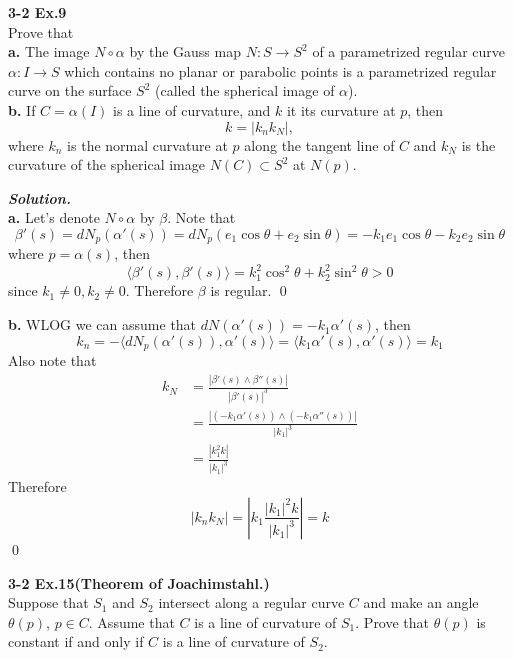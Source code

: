 \documentclass{article}
\begin{document}
\par
\textbf{3-2 Ex.9}\\
Prove that\\
\textbf{a. }The image $N \circ \alpha$ by the Gauss map
$N: S \to S^2$ of a parametrized regular curve $\alpha: I \to S$
which contains no planar or parabolic points is a parametrized
regular curve on the surface $S^2$ (called the spherical image
of $\alpha$).\\
\textbf{b. }If $C = \alpha(I)$ is a line of curvature, and $k$
it its curvature at $p$, then
$$
    k = \vert k_nk_N \vert,
$$
where $k_n$ is the normal curvature at $p$ along the tangent
line of $C$ and $k_N$ is the curvature of the spherical image
$N(C) \subset S^2$ at $N(p)$.

\par
\textbf{\textit{Solution.}}\\
\textbf{a. }Let's denote $N \circ \alpha$ by $\beta$.
Note that
$$
    \beta'(s) = dN_p(\alpha'(s)) = dN_p(e_1 \cos \theta + e_2 \sin \theta)
    = -k_1e_1 \cos \theta - k_2e_2 \sin \theta
$$
where $p = \alpha(s)$, then
$$
    \langle \beta'(s), \beta'(s) \rangle = k_1^2 \cos^2 \theta + k_2^2 \sin^2 \theta > 0
$$
since $k_1 \neq 0, k_2 \neq 0$. Therefore $\beta$ is regular. \qed

\par
\textbf{b. }WLOG we can assume that $dN(\alpha'(s)) = -k_1\alpha'(s)$, then
$$
    k_n = -\langle dN_p(\alpha'(s)), \alpha'(s) \rangle = \langle k_1\alpha'(s), \alpha'(s) \rangle = k_1
$$
Also note that 
$$
\begin{aligned}
    k_N &= \frac{|\beta'(s) \wedge \beta''(s)|}{|\beta'(s)|^3}\\
    &= \frac{|(-k_1 \alpha'(s)) \wedge (-k_1 \alpha''(s))|}{|k_1|^3}\\
    &= \frac{|k_1^2k|}{|k_1|^3}
\end{aligned}
$$
Therefore
$$
    |k_nk_N| = |k_1 \frac{|k_1|^2k}{|k_1|^3}| = k
$$
\qed

\par
\textbf{3-2 Ex.15(Theorem of Joachimstahl.)}\\
Suppose that $S_1$ and $S_2$ intersect along a regular curve
$C$ and make an angle $\theta(p)$, $p \in C$. Assume that
$C$ is a line of curvature of $S_1$. Prove that $\theta(p)$
is constant if and only if $C$ is a line of curvature of $S_2$.
\end{document}
